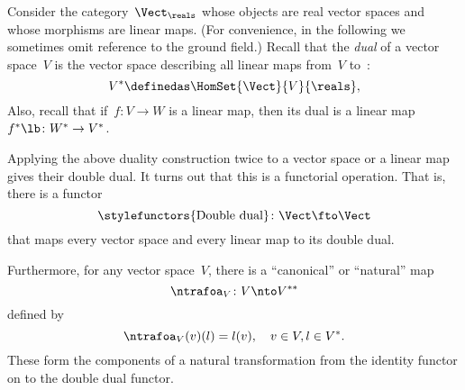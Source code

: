 \begin{example}
    \label{ex:Vect}
    Consider the category~$\Vect_{\reals}$ whose objects are real vector spaces and whose morphisms are linear maps.
    (For convenience, in the following we sometimes omit reference to the ground field.) Recall that the \emph{dual} of a vector space~$V$ is the vector space describing all linear maps from~$V$ to~\reals:
    \begin{equation}
        \label{eq:dual-vector-space}
        V^* \definedas \HomSet{\Vect}{V}{\reals},
    \end{equation}
    Also, recall that if~$f\colon V \to W$ is a linear map, then its dual is a linear map~$f^* \lb  \colon W^* \to V^*$.

    Applying the above duality construction twice to a vector space or a linear map gives their double dual.
    It turns out that this is a functorial operation.
    That is, there is a functor~
    \begin{equation}
        \label{eq:double-dual-functor}
        \text{\stylefunctors{Double dual}}\colon \Vect \fto \Vect
    \end{equation}
    that maps every vector space and every linear map to its double dual.

    Furthermore, for any vector space~$V$, there is a ``canonical'' or ``natural'' map~
    \begin{equation}
        \ntrafoa_V \colon V \nto V^{**}
    \end{equation}
    defined by
    \begin{equation}
        \label{eq:natural-trafo-to-double-dual}
        \ntrafoa_V(v)(l) = l(v), \quad  v \in V, l \in V^*.
    \end{equation}
    These form the components of a natural transformation from the identity functor on \Vect to the double dual functor.
    \begin{center}
    \end{center}
\end{example}

